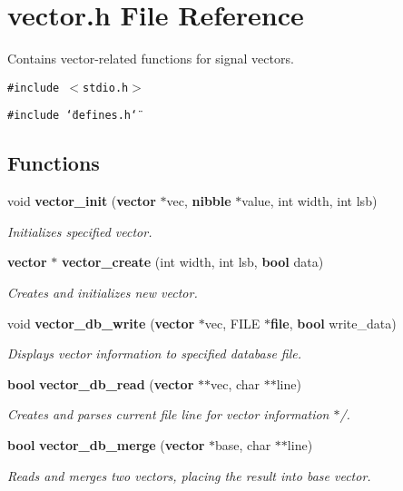 \section{vector.h File Reference}
\label{vector_8h}
Contains vector-related functions for signal vectors. 


{\tt \#include $<$stdio.h$>$}\par
{\tt \#include \char`\"{}defines.h\char`\"{}}\par
\subsection*{Functions}
\begin{CompactItemize}
\item 
void {\bf vector\_\-init} ({\bf vector} $\ast$vec, {\bf nibble} $\ast$value, int width, int lsb)
\begin{CompactList}\small\item\em Initializes specified vector.\item\end{CompactList}\item 
{\bf vector} $\ast$ {\bf vector\_\-create} (int width, int lsb, {\bf bool} data)
\begin{CompactList}\small\item\em Creates and initializes new vector.\item\end{CompactList}\item 
void {\bf vector\_\-db\_\-write} ({\bf vector} $\ast$vec, FILE $\ast${\bf file}, {\bf bool} write\_\-data)
\begin{CompactList}\small\item\em Displays vector information to specified database file.\item\end{CompactList}\item 
{\bf bool} {\bf vector\_\-db\_\-read} ({\bf vector} $\ast$$\ast$vec, char $\ast$$\ast$line)
\begin{CompactList}\small\item\em Creates and parses current file line for vector information $\ast$/.\item\end{CompactList}\item 
{\bf bool} {\bf vector\_\-db\_\-merge} ({\bf vector} $\ast$base, char $\ast$$\ast$line)
\begin{CompactList}\small\item\em Reads and merges two vectors, placing the result into base vector.\item\end{CompactList}\item 
$$
\end{CompactItemize}
